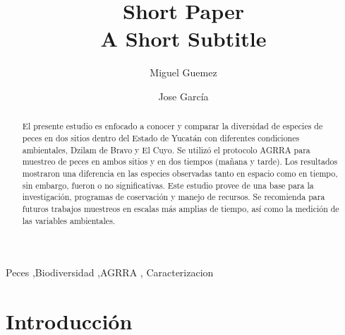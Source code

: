 \documentclass[
  authoryear,
  preprint,
  3p]{elsarticle}
\begin{document}
\begin{frontmatter}
\title{Short Paper \\\large{A Short Subtitle} }
\author[1]{Miguel Guemez%
%
}
\author[1]{Jose García%
%
}




        
\begin{abstract}
El presente estudio es enfocado a conocer y comparar la diversidad de
especies de peces en dos sitios dentro del Estado de Yucatán con
diferentes condiciones ambientales, Dzilam de Bravo y El Cuyo. Se
utilizó el protocolo AGRRA para muestreo de peces en ambos sitios y en
dos tiempos (mañana y tarde). Los resultados mostraron una diferencia en
las especies observadas tanto en espacio como en tiempo, sin embargo,
fueron o no significativas. Este estudio provee de una base para la
investigación, programas de coservación y manejo de recursos. Se
recomienda para futuros trabajos muestreos en escalas más amplias de
tiempo, así como la medición de las variables ambientales.
\end{abstract}





\begin{keyword}
    Peces \sep Biodiversidad \sep AGRRA \sep 
    Caracterizacion
\end{keyword}
\end{frontmatter}
    
\section{Introducción}\label{introducciuxf3n}
\end{document}
